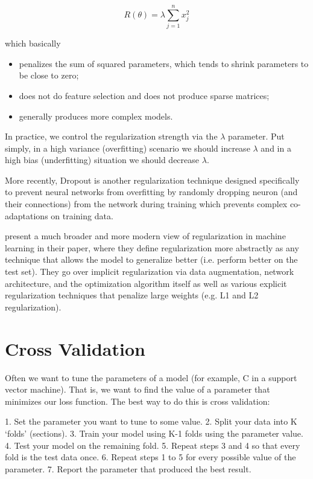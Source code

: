 $$
R(\theta) = \lambda \sum_{j=1}^{n} x_j^2
$$

which basically

\begin{itemize}
    \item penalizes the sum of squared parameters, which tends to shrink parameters to be close to zero;
    \item does not do feature selection and does not produce sparse matrices;
    \item generally produces more complex models.
\end{itemize}

In practice, we control the regularization strength via the $\lambda$ parameter. Put simply, in a high variance (overfitting) scenario we should increase $\lambda$ and in a high bias (underfitting) situation we should decrease $\lambda$.

More recently, Dropout\cite{dropout} is another regularization technique designed specifically to prevent neural networks from overfitting by randomly dropping neuron (and their connections) from the network during training which prevents complex co-adaptations on training data.

\citeauthor{regularizationsurvey} present a much broader and more modern view of regularization in machine learning in their \citeyear{regularizationsurvey} paper\cite{regularizationsurvey}, where they define regularization more abstractly as any technique that allows the model to generalize better (i.e. perform better on the test set). They go over implicit regularization via data augmentation, network architecture, and the optimization algorithm itself as well as various explicit regularization techniques that penalize large weights (e.g. L1 and L2 regularization).

\section{Cross Validation}

Often we want to tune the parameters of a model (for example, C in a support vector machine). That is, we want to find the value of a parameter that minimizes our loss function. The best way to do this is cross validation:

1. Set the parameter you want to tune to some value.
2. Split your data into K ‘folds’ (sections).
3. Train your model using K-1 folds using the parameter value.
4. Test your model on the remaining fold.
5. Repeat steps 3 and 4 so that every fold is the test data once.
6. Repeat steps 1 to 5 for every possible value of the parameter.
7. Report the parameter that produced the best result.

